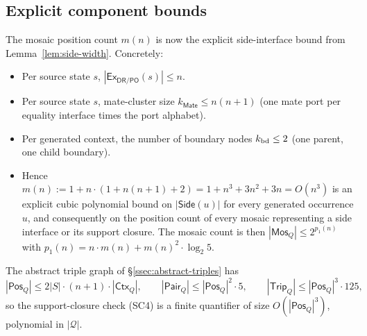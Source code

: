 \documentclass[11pt]{article}
\newcommand{\DR}{\mathsf{DR}}
\newcommand{\PO}{\mathsf{PO}}
\newcommand{\Ex}{\mathsf{Ex}}
\newcommand{\Q}{\mathcal Q}
\newcommand{\Mos}{\mathsf{Mos}}
\newcommand{\Ctx}{\mathsf{Ctx}}
\newcommand{\Mate}{\mathsf{Mate}}
\newcommand{\Pos}{\mathsf{Pos}}
\newcommand{\Pair}{\mathsf{Pair}}
\newcommand{\Trip}{\mathsf{Trip}}
\newcommand{\Side}{\mathsf{Side}}
\begin{document}
\subsection{Explicit component bounds}
\label{ssec:bounds}

The mosaic position count $m(n)$ is now the explicit
side-interface bound from Lemma~\ref{lem:side-width}.  Concretely:
\begin{itemize}[leftmargin=2em]
\item Per source state $s$, $|\Ex_{\DR/\PO}(s)|\le n$.
\item Per source state $s$, mate-cluster size
$k_{\Mate}\le n(n+1)$ (one mate port per equality interface times
the port alphabet).
\item Per generated context, the number of boundary nodes
$k_{\rm bd}\le 2$ (one parent, one child boundary).
\item Hence $m(n):=1+n\cdot(1+n(n+1)+2)=1+n^3+3n^2+3n=O(n^3)$ is
an explicit cubic polynomial bound on $|\Side(u)|$ for every
generated occurrence $u$, and consequently on the position count
of every mosaic representing a side interface or its support
closure.  The mosaic count is then $|\Mos_Q|\le 2^{p_1(n)}$ with
$p_1(n)=n\cdot m(n)+m(n)^2\cdot\log_2 5$.
\end{itemize}
The abstract triple graph of \S\ref{ssec:abstract-triples} has
\[
  |\Pos_Q|\le 2|S|\cdot(n+1)\cdot|\Ctx_Q|,
  \qquad
  |\Pair_Q|\le|\Pos_Q|^2\cdot 5,
  \qquad
  |\Trip_Q|\le|\Pos_Q|^3\cdot 125,
\]
so the support-closure check (SC4) is a finite quantifier of size
$O(|\Pos_Q|^3)$, polynomial in $|\Q|$.
\end{document}
